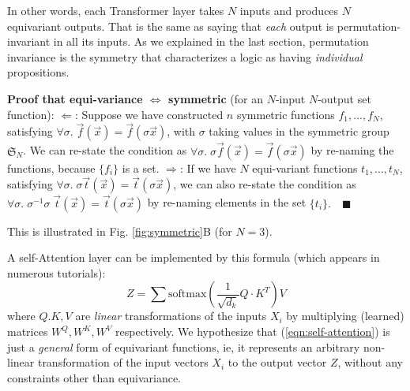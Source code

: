 \documentclass[orivec]{llncs}
\begin{document}
In other words, each Transformer layer takes $N$ inputs and produces $N$ equivariant outputs.  That is the same as saying that \textit{each} output is permutation-invariant in all its inputs.  As we explained in the last section, permutation invariance is the symmetry that characterizes a logic as having \textit{individual} propositions.

\textbf{Proof that equi-variance $\Leftrightarrow$ symmetric} (for an $N$-input $N$-output set function): $\Leftarrow$: Suppose we have constructed $n$ symmetric functions $f_1, ..., f_N$, satisfying $\forall \sigma. \; \vec{f}(\vec{x}) = \vec{f}(\sigma \vec{x})$, with $\sigma$ taking values in the symmetric group $\mathfrak{S}_N$.  We can re-state the condition as $\forall \sigma. \; \sigma \vec{f}(\vec{x}) = \vec{f}(\sigma \vec{x})$ by re-naming the functions, because $\{ f_i \}$ is a set.  $\Rightarrow$: If we have $N$ equi-variant functions $t_1, ..., t_N$, satisfying $\forall \sigma. \; \sigma \vec{t}(\vec{x}) = \vec{t}(\sigma \vec{x})$, we can also re-state the condition as $\forall \sigma. \; \sigma^{-1} \sigma \; \vec{t}(\vec{x}) = \vec{t}(\sigma \vec{x})$ by re-naming elements in the set $\{ t_i \}. \quad \blacksquare$

This is illustrated in Fig. \ref{fig:symmetric}B (for $N = 3$).

A self-Attention layer can be implemented by this formula (which appears in numerous tutorials):
\begin{equation}
\label{eqn:self-attention}
Z = \sum \mathrm{softmax}(\frac{1}{\sqrt{d_k}} Q \cdot K^T) V
\end{equation}
where $Q. K, V$ are \textit{linear} transformations of the inputs $X_i$ by multiplying (learned) matrices $W^Q, W^K, W^V$ respectively.  We hypothesize that (\ref{eqn:self-attention}) is just a \textit{general} form of equivariant functions, ie, it represents an arbitrary non-linear transformation of the input vectors $X_i$ to the output vector $Z$, without any constraints other than equivariance.
\end{document}
